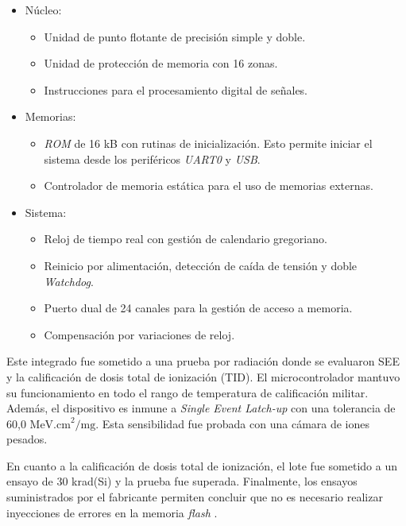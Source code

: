 \begin{itemize}
    \item Núcleo:
        \begin{itemize}
            \item Unidad de punto flotante de precisión simple y doble.
            \item Unidad de protección de memoria con 16 zonas.
            \item Instrucciones para el procesamiento digital de señales.
        \end{itemize}
    \item Memorias:
        \begin{itemize}
            \item \emph{ROM} de 16 kB con rutinas de inicialización. Esto permite iniciar el sistema desde los periféricos \emph{UART0} y \emph{USB}.
            \item Controlador de memoria estática para el uso de memorias externas.
        \end{itemize}
    \item Sistema:
        \begin{itemize}
            \item Reloj de tiempo real con gestión de calendario gregoriano.
            \item Reinicio por alimentación, detección de caída de tensión y doble \emph{Watchdog}.
            \item Puerto dual de 24 canales para la gestión de acceso a memoria.
            \item Compensación por variaciones de reloj.
        \end{itemize}
\end{itemize}

\newpage

Este integrado fue sometido a una prueba por radiación donde se evaluaron SEE y la calificación de dosis total de ionización (TID).
El microcontrolador mantuvo su funcionamiento en todo el rango de temperatura de calificación militar.
Además, el dispositivo es inmune a \emph{Single Event Latch-up} con una tolerancia de 60,0 $\text{MeV.cm}^2\text{/mg}$.
Esta sensibilidad fue probada con una cámara de iones pesados.

En cuanto a la calificación de dosis total de ionización, el lote fue sometido a un ensayo de 30 krad(Si) y la prueba fue superada.
Finalmente, los ensayos suministrados por el fabricante permiten concluir que no es necesario realizar inyecciones de errores en la memoria \emph{flash} \citep{ARTICLE:dutrad}.

